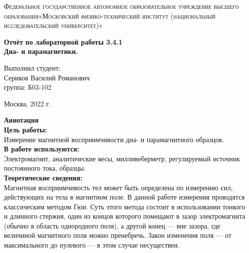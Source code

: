 \documentclass[a4paper, 12pt]{article}%
\begin{document}
	\begin{titlepage}
		\begin{center}
			\textsc{Федеральное государственное автономное образовательное учреждение высшего образования«Московский физико-технический институт (национальный исследовательский университет)»\\[5mm]
			}
			
			\vfill
			
			\textbf{Отчёт по лабораторной работы 3.4.1\\[3mm]
				Диа- и парамагнетики.
				\\[50mm]
			}
			
		\end{center}
		
		\hfill
		\begin{minipage}{.5\textwidth}
			Выполнил студент:\\[2mm]
			Сериков Василий Романович\\[2mm]
			группа: Б03-102\\[5mm]
			
		\end{minipage}
		\vfill
		\begin{center}
			Москва, 2022 г.
		\end{center}
		
	\end{titlepage}
	
	\newpage
	\textbf{Аннотация}\\
	
	
	\textbf{Цель работы: }\\
	
	Измерение магнитной восприимчивости диа- и парамагнитного образцов.\\
	
	\textbf{В работе используются: }\\
	
	Электромагнит, аналитические весы, милливеберметр, регулируемый источник постоянного тока, образцы.\\
	
	\textbf{Теоретические сведения: } \\
	
	Магнитная восприимчивость тел может быть определена по измерению сил, действующих на тела в магнитном поле. В данной работе измерения проводятся классическим методом Гюи. Суть этого метода состоит в использовании тонкого и длинного стержня, один из концов которого помещают в зазор электромагнита (обычно в область однородного поля), а другой конец — вне зазора, где величиной магнитного поля можно пренебречь. Закон изменения поля — от максимального до нулевого — в этом случае несуществен.
	
\end{document}
